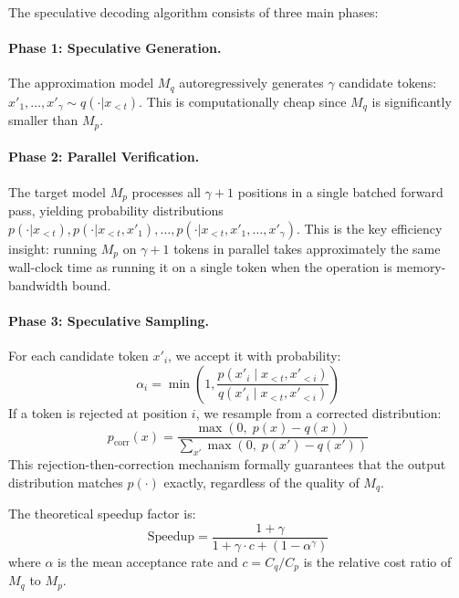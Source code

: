 \documentclass[11pt]{article}
\begin{document}
The speculative decoding algorithm \citep{leviathan2023fast} consists of three main phases:

\paragraph{Phase 1: Speculative Generation.}
The approximation model $M_q$ autoregressively generates $\gamma$ candidate tokens: $x'_1, \ldots, x'_\gamma \sim q(\cdot|x_{<t})$. This is computationally cheap since $M_q$ is significantly smaller than $M_p$.

\paragraph{Phase 2: Parallel Verification.}
The target model $M_p$ processes all $\gamma + 1$ positions in a single batched forward pass, yielding probability distributions $p(\cdot|x_{<t}), p(\cdot|x_{<t}, x'_1), \ldots, p(\cdot|x_{<t}, x'_1, \ldots, x'_\gamma)$. This is the key efficiency insight: running $M_p$ on $\gamma+1$ tokens in parallel takes approximately the same wall-clock time as running it on a single token when the operation is memory-bandwidth bound.

\paragraph{Phase 3: Speculative Sampling.}
For each candidate token $x'_i$, we accept it with probability:
\begin{equation}
\alpha_i = \min\left(1, \frac{p(x'_i \mid x_{<t}, x'_{<i})}{q(x'_i \mid x_{<t}, x'_{<i})}\right)
\label{eq:acceptance}
\end{equation}
If a token is rejected at position $i$, we resample from a corrected distribution:
\begin{equation}
p_{\text{corr}}(x) = \frac{\max(0,\; p(x) - q(x))}{\sum_{x'} \max(0,\; p(x') - q(x'))}
\label{eq:correction}
\end{equation}
This rejection-then-correction mechanism formally guarantees that the output distribution matches $p(\cdot)$ exactly, regardless of the quality of $M_q$.

The theoretical speedup factor is:
\begin{equation}
\text{Speedup} = \frac{1 + \gamma}{1 + \gamma \cdot c + (1 - \alpha^\gamma)}
\label{eq:speedup}
\end{equation}
where $\alpha$ is the mean acceptance rate and $c = C_q / C_p$ is the relative cost ratio of $M_q$ to $M_p$.
\end{document}
